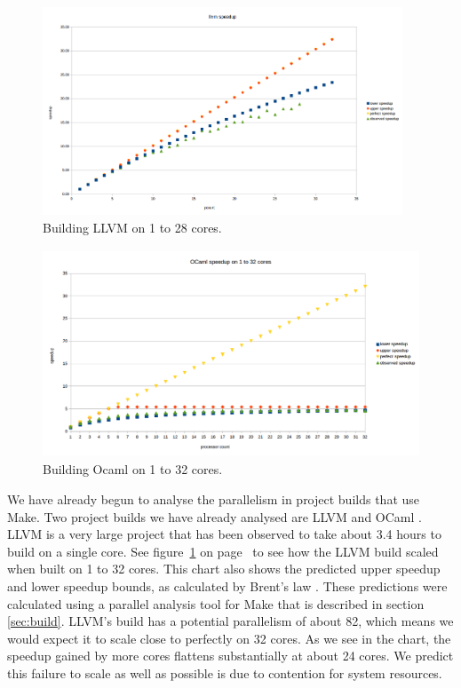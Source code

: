 \documentclass[10pt]{article}
\begin{document}





\begin{figure}[t]
  \centering
  \includegraphics[height=6.2cm]{llvm-speedup-chart.png}
  \caption{Building LLVM on 1 to 28 cores.}\label{fig:llvm}  %
\end{figure}

\begin{figure}[t]
  \centering
  \includegraphics[height=6.2cm]{ocaml-speedup-chart.png}
  \caption{Building Ocaml on 1 to 32 cores.}\label{fig:ocaml}
\end{figure}

We have already begun to analyse the parallelism in project builds that use Make.  Two
project builds we have already analysed are LLVM \cite{llvm} and OCaml \cite{ocaml}.
LLVM is a very large project that has been observed to take about 3.4 hours to build on a
single core.  See figure~\ref{fig:llvm} on page~\pageref{fig:llvm} to see how the LLVM build scaled
when built on 1 to 32 cores.  This chart also shows the predicted upper speedup and lower speedup bounds, as
calculated by Brent's law \cite{brent1974parallel}.  These predictions were calculated using a
parallel analysis tool for Make that is described in section \ref{sec:build}.  LLVM's build has
a potential parallelism of about 82, which means we would expect it to scale close to perfectly on 32 cores.
As we see in the chart, the speedup gained by more cores flattens substantially at about 24 cores.
We predict this failure to scale as well as possible is due to contention for system resources.
\end{document}

